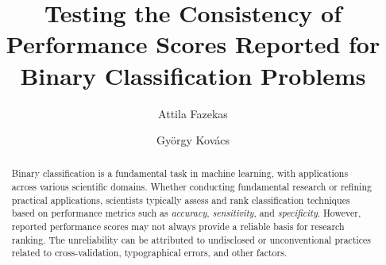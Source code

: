 \documentclass[3p, times]{elsarticle}
\begin{document}
\begin{frontmatter}




\title{Testing the Consistency of Performance Scores Reported for Binary Classification Problems}


\author[1]{Attila Fazekas} 

\author[2]{Gy\"orgy Kov\'acs}



\begin{abstract}
{
Binary classification is a fundamental task in machine learning, with applications across various scientific domains. Whether conducting fundamental research or refining practical applications, scientists typically assess and rank classification techniques based on performance metrics such as \emph{accuracy}, \emph{sensitivity}, and \emph{specificity}. However, reported performance scores may not always provide a reliable basis for research ranking. The unreliability can be attributed to undisclosed or unconventional practices related to cross-validation, typographical errors, and other factors.}


\end{abstract}
\end{frontmatter}
\end{document}
